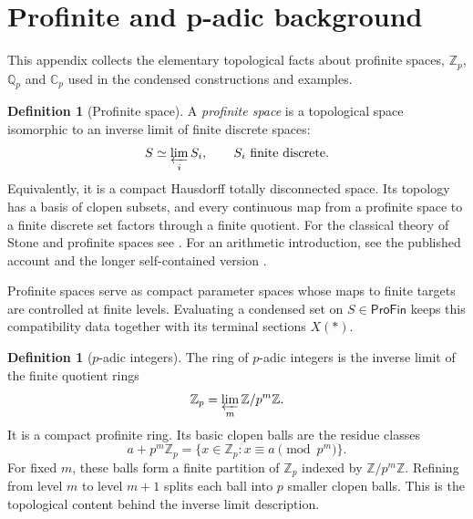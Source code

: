 \documentclass[10pt]{amsart}
\newcommand{\ProFin}{\mathsf{ProFin}}
\newcommand{\Z}{\mathbb{Z}}
\newcommand{\Zp}{\mathbb{Z}_p}
\newcommand{\Qp}{\mathbb{Q}_p}
\newcommand{\Cp}{\mathbb{C}_p}
\theoremstyle{plain}
\theoremstyle{definition}
\newtheorem{definition}[theorem]{Definition}
\begin{document}
\section{Profinite and p-adic background}
\label{app:topological-background}

This appendix collects the elementary topological facts about profinite spaces,
$\Zp$, $\Qp$ and $\Cp$ used in the condensed constructions and examples.

\begin{definition}[Profinite space]
A \emph{profinite space} is a topological space isomorphic to an inverse limit
of finite discrete spaces:
\[
  S\simeq \varprojlim_i S_i,\qquad S_i\ \text{finite discrete}.
\]
Equivalently, it is a compact Hausdorff totally disconnected space. Its
topology has a basis of clopen subsets, and every continuous map from a
profinite space to a finite discrete set factors through a finite quotient.
For the classical theory of Stone and profinite spaces see
\cite{JohnstoneStoneSpaces}. For an arithmetic introduction, see the published
account \cite{PerezBuendiaStoneGaceta} and the longer self-contained version
\cite{PerezBuendiaStoneArxiv}.
\end{definition}

Profinite spaces serve as compact parameter spaces whose maps to finite targets
are controlled at finite levels. Evaluating a condensed set on
$S\in\ProFin$ keeps this compatibility data together with its terminal sections
$X(*)$.

\begin{definition}[$p$-adic integers]
The ring of $p$-adic integers is the inverse limit of the finite quotient
rings
\[
  \Zp=\varprojlim_m \Z/p^m\Z.
\]
It is a compact profinite ring. Its basic clopen balls are the residue classes
\[
  a+p^m\Zp=\{x\in\Zp:x\equiv a\pmod {p^m}\}.
\]
For fixed $m$, these balls form a finite partition of $\Zp$ indexed by
$\Z/p^m\Z$. Refining from level $m$ to level $m+1$ splits each ball into
$p$ smaller clopen balls. This is the topological content behind the inverse
limit description.
\end{definition}
\end{document}
